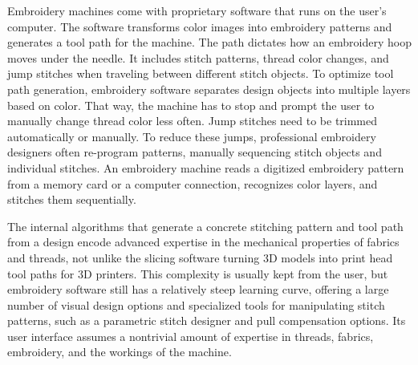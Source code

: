 \documentclass[header.tex]{subfiles}
\begin{document}
Embroidery machines come with proprietary software that runs on the user's computer. The software transforms color images into embroidery patterns and generates a tool path for the machine. The path dictates how an embroidery hoop moves under the needle. It includes stitch patterns, thread color changes, and jump stitches when traveling between different stitch objects. To optimize tool path generation, embroidery software separates design objects into multiple layers based on color. 
That way, the machine has to stop and prompt the user to manually change thread color less often. Jump stitches need to be trimmed automatically or manually. 
To reduce these jumps, professional embroidery designers often re-program patterns, manually sequencing stitch objects and individual stitches. 
An embroidery machine reads a digitized embroidery pattern from a memory card or a computer connection, recognizes color layers, and stitches them sequentially.


The internal algorithms that generate a concrete stitching pattern and tool path from a design encode advanced expertise in the mechanical properties of fabrics and threads, not unlike the slicing software turning 3D models into print head tool paths for 3D printers. This complexity is usually kept from the user, but embroidery software still has a relatively steep learning curve, offering a large number of visual design options and specialized tools for manipulating stitch patterns, such as a parametric stitch designer and pull compensation options.
Its user interface assumes a nontrivial amount of expertise in threads, fabrics, embroidery, and the workings of the machine.
\end{document}
